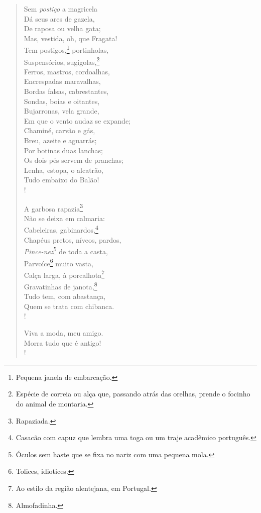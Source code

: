 \begin{verse}
Sem \emph{postiço} a magricela\\
Dá seus ares de gazela,\\
De raposa ou velha gata;\\
Mas, vestida, oh, que Fragata!\\
Tem postigos,\footnote{ Pequena janela de embarcação.} portinholas,\\
Suspensórios, sugigolas,\footnote{ Espécie de correia ou alça que, 
                                  passando atrás das orelhas, prende 
                                  o focinho do animal de montaria.}\\
Ferros, mastros, cordoalhas,\\
Encrespadas maravalhas,\\
Bordas falsas, cabrestantes,\\
Sondas, boias e oitantes,\\
Bujarronas, vela grande,\\
Em que o vento audaz se expande;\\
Chaminé, carvão e gás,\\
Breu, azeite e aguarrás;\\
Por botinas duas lanchas;\\
Os dois pés servem de pranchas;\\
Lenha, estopa, o alcatrão,\\
Tudo embaixo do Balão!\\!

A garbosa rapazia\footnote{ Rapaziada.}\\
Não se deixa em calmaria:\\
Cabeleiras, gabinardos,\footnote{ Casacão com capuz que lembra uma toga ou um traje acadêmico português.}\\
Chapéus pretos, níveos, pardos,\\
\emph{Pince-nez}\footnote{ Óculos sem haste que se fixa no nariz com uma pequena mola.} de toda a casta,\\
Parvoíce\footnote{ Tolices, idiotices.} muito vasta,\\
Calça larga, à porcalhota\footnote{ Ao estilo da região alentejana, em Portugal.}\\
Gravatinhas de janota,\footnote{ Almofadinha.}\\
Tudo tem, com abastança,\\
Quem se trata com chibanca.\\!

Viva a moda, meu amigo.\\
Morra tudo que é antigo!\\!


\end{verse}
